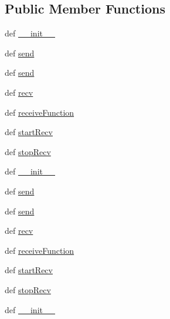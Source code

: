 \subsection*{Public Member Functions}
\begin{DoxyCompactItemize}
\item 
def \hyperlink{classnetwork_1_1NETWORK__CORE_1_1UDPChannel_a628f06fad9f7da98bbc9b5b6630271ea}{\+\_\+\+\_\+init\+\_\+\+\_\+}
\item 
def \hyperlink{classnetwork_1_1NETWORK__CORE_1_1UDPChannel_ada99dd7f7ad27fc1db37062daf953e1c}{send}
\item 
def \hyperlink{classnetwork_1_1NETWORK__CORE_1_1UDPChannel_ada99dd7f7ad27fc1db37062daf953e1c}{send}
\item 
def \hyperlink{classnetwork_1_1NETWORK__CORE_1_1UDPChannel_a3b4c88da7b885083e8aa44aef436e8e6}{recv}
\item 
def \hyperlink{classnetwork_1_1NETWORK__CORE_1_1UDPChannel_a6edcb5683390f03f4b72e0525bc4e1f7}{receive\+Function}
\item 
def \hyperlink{classnetwork_1_1NETWORK__CORE_1_1UDPChannel_a713bd6e7b9bbe515669fe8e23981be8d}{start\+Recv}
\item 
def \hyperlink{classnetwork_1_1NETWORK__CORE_1_1UDPChannel_aa5a9c175e34181c0aa2b49ad2f9b10f6}{stop\+Recv}
\item 
def \hyperlink{classnetwork_1_1NETWORK__CORE_1_1UDPChannel_a628f06fad9f7da98bbc9b5b6630271ea}{\+\_\+\+\_\+init\+\_\+\+\_\+}
\item 
def \hyperlink{classnetwork_1_1NETWORK__CORE_1_1UDPChannel_ada99dd7f7ad27fc1db37062daf953e1c}{send}
\item 
def \hyperlink{classnetwork_1_1NETWORK__CORE_1_1UDPChannel_ada99dd7f7ad27fc1db37062daf953e1c}{send}
\item 
def \hyperlink{classnetwork_1_1NETWORK__CORE_1_1UDPChannel_a3b4c88da7b885083e8aa44aef436e8e6}{recv}
\item 
def \hyperlink{classnetwork_1_1NETWORK__CORE_1_1UDPChannel_a6edcb5683390f03f4b72e0525bc4e1f7}{receive\+Function}
\item 
def \hyperlink{classnetwork_1_1NETWORK__CORE_1_1UDPChannel_a713bd6e7b9bbe515669fe8e23981be8d}{start\+Recv}
\item 
def \hyperlink{classnetwork_1_1NETWORK__CORE_1_1UDPChannel_aa5a9c175e34181c0aa2b49ad2f9b10f6}{stop\+Recv}
\item 
def \hyperlink{classnetwork_1_1NETWORK__CORE_1_1UDPChannel_a628f06fad9f7da98bbc9b5b6630271ea}{\+\_\+\+\_\+init\+\_\+\+\_\+}
\item 

\end{DoxyCompactItemize}
